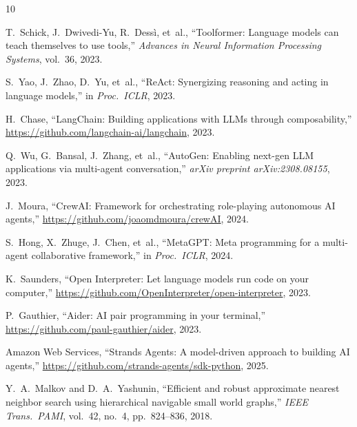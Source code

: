 \documentclass[9pt,twocolumn,letterpaper]{extarticle}
\begin{document}
\balance

\begin{thebibliography}{10}

T.~Schick, J.~Dwivedi-Yu, R.~Dess{\`i}, et~al.,
``Toolformer: Language models can teach themselves to use tools,''
\textit{Advances in Neural Information Processing Systems}, vol.~36, 2023.

S.~Yao, J.~Zhao, D.~Yu, et~al.,
``ReAct: Synergizing reasoning and acting in language models,''
in \textit{Proc.\ ICLR}, 2023.

H.~Chase,
``LangChain: Building applications with LLMs through composability,''
\url{https://github.com/langchain-ai/langchain}, 2023.

Q.~Wu, G.~Bansal, J.~Zhang, et~al.,
``AutoGen: Enabling next-gen LLM applications via multi-agent conversation,''
\textit{arXiv preprint arXiv:2308.08155}, 2023.

J.~Moura,
``CrewAI: Framework for orchestrating role-playing autonomous AI agents,''
\url{https://github.com/joaomdmoura/crewAI}, 2024.

S.~Hong, X.~Zhuge, J.~Chen, et~al.,
``MetaGPT: Meta programming for a multi-agent collaborative framework,''
in \textit{Proc.\ ICLR}, 2024.

K.~Saunders,
``Open Interpreter: Let language models run code on your computer,''
\url{https://github.com/OpenInterpreter/open-interpreter}, 2023.

P.~Gauthier,
``Aider: AI pair programming in your terminal,''
\url{https://github.com/paul-gauthier/aider}, 2023.

Amazon Web Services,
``Strands Agents: A model-driven approach to building AI agents,''
\url{https://github.com/strands-agents/sdk-python}, 2025.

Y.~A.~Malkov and D.~A.~Yashunin,
``Efficient and robust approximate nearest neighbor search using hierarchical navigable small world graphs,''
\textit{IEEE Trans.\ PAMI}, vol.~42, no.~4, pp.~824--836, 2018.

\end{thebibliography}
\end{document}
